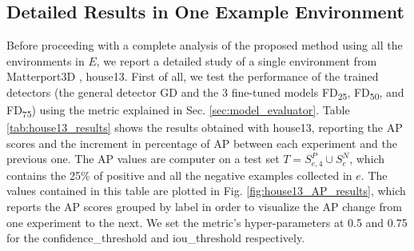\subsection{Detailed Results in One Example Environment}

Before proceeding with a complete analysis of the proposed method using all the environments in $E$, we report a detailed study of a single environment from Matterport3D \cite{matterport}, \textsf{house13}. First of all, we test the performance of the trained detectors (the general detector \textsf{GD} and the 3 fine-tuned models \textsf{FD\textsubscript{25}}, \textsf{FD\textsubscript{50}}, and \textsf{FD\textsubscript{75}}) using the metric explained in Sec. \ref{sec:model_evaluator}. Table \ref{tab:house13_results} shows the results obtained with \textsf{house13}, reporting the AP scores and the increment in percentage of AP between each experiment and the previous one. The AP values are computer on a test set $T = S^{P}_{e, 4} \cup S^{N}_{e}$, which contains the 25\% of positive and all the negative examples collected in $e$. The values contained in this table are plotted in Fig. \ref{fig:house13_AP_results}, which reports the AP scores grouped by label in order to visualize the AP change from one experiment to the next. We set the metric's hyper-parameters at 0.5 and 0.75 for the \textsf{confidence\_threshold} and \textsf{iou\_threshold} respectively.

